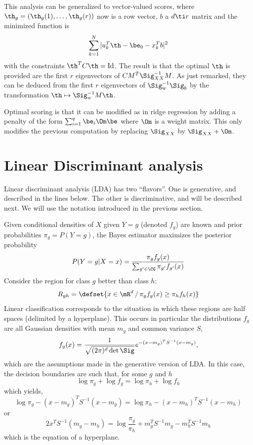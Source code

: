 \bigskip

This analysis can be generalized to
vector-valued scores, where $\th_g=(\th_g(1), \ldots, \th_g(r))$ now is
a row vector, $b$ a $d\ti r$ matrix and the minimized function
is
$$
\sum_{k=1}^N |u_k^T\th - \be_0 - x_k^T b|^2
$$
with the constraints $\th^T C\th = \mathrm{Id}$. The result is that the
optimal $\th$ is provided are the first $r$ eigenvectors of
$CM^T\Sig_{XX}^{-1} M$. As just remarked, they can be deduced from the first $r$ eigenvectors of $\Sig_w^{-1}\Sig_b$ by the transformation $\th \mapsto \Sig_w^{-1}M\th$.

Optimal scoring is that it can be modified as
in ridge regression by adding a penalty of the
form $\sum_{i=1}^q \be_i\Om\be$ where $\Om$ is a weight matrix. This
only modifies the previous computation by replacing $\Sig_{XX}$ by
$\Sig_{XX}+\Om$.



\section{Linear Discriminant analysis}
\label{sec:lda}

Linear discriminant analysis (LDA) has two ``flavors''. One is generative, and described in the lines below. The other is discriminative, and will be described next. We will use the notation introduced in the previous section.


Given conditional densities of $X$ given $Y=g$ (denoted
$f_g$) are known and prior probabilities $\pi_g =
P(Y=g)$, the Bayes estimator maximizes the posterior probability
$$
P(Y=g|X=x) = \frac{\pi_g f_g(x)}{\sum_{g'\in \CG} \pi_{g'} f_{g'}(x)}
$$
Consider the region for class $g$ better than class $h$:
$$
R_{gh} = \defset{x\in\mR^d\,/\, \pi_g f_g(x) \geq \pi_{h} f_h(x)}
$$
Linear classification corresponds to the situation in which these regions
are half spaces (delimited by a hyperplane). This occurs in particular
the distributions $f_g$ are all Gaussian densities with
mean $m_g$ and common variance $S$,
$$
f_g(x) = \frac{1}{\sqrt{(2\pi)^d\det \Sig}} e^{-(x-m_g)^T S^{-1}
(x-m_g)},
$$
which are the assumptions made in the generative version of LDA.
In this case, the decision boundaries are such that, for some $g$ and $h$
$$
\log \pi_g + \log f_g = \log\pi_h + \log f_h
$$
which yields, 
$$
\log \pi_g -(x-m_g)^T S^{-1}
(x-m_g) = \log\pi_h - (x-m_h)^T S^{-1}
(x-m_h)
$$
or
$$
2 x^TS^{-1}(m_g-m_h) = \log \frac{\pi_g}{\pi_h} +
m_g^TS^{-1}m_g - m_h^TS^{-1}m_h
$$
which is the equation of a hyperplane. 

